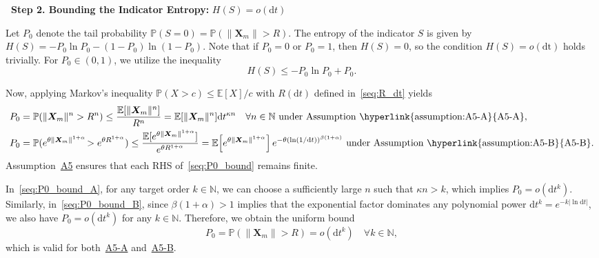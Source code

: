 \bigskip
\noindent\textbf{\textbullet\ Step 2. Bounding the Indicator Entropy:} $H(S)=o(\mathrm dt)$

Let $P_0$ denote the tail probability $\mathbb{P}(S=0) = \mathbb{P}(\|\bm{X}_m\| > R)$. The entropy of the indicator $S$ is given by $H(S) = -P_0\ln P_0 - (1-P_0)\ln(1-P_0)$. Note that if $P_0=0$ or $P_0=1$, then $H(S)=0$, so the condition $H(S)=o(\mathrm{dt})$ holds trivially. For $P_0 \in (0,1)$, we utilize the inequality
\begin{equation}
    H(S) \leq -P_0\ln P_0 + P_0.
    \label{seq:H(S)_bound}
\end{equation}

Now, applying Markov's inequality $\mathbb P(X>c)\leq\mathbb E[X]/c$ with $R(\mathrm dt)$ defined in~\eqref{seq:R_dt} yields
\begin{subequations}\label{seq:P0_bound}
\renewcommand{\theequation}{\theparentequation-\Alph{equation}}
\begin{align}
    P_0&=\mathbb P(\|\bm X_m\|^n>R^n)
    \leq\frac{\mathbb E[\|\bm X_m\|^n]}{R^n}
    =\mathbb E[\|\bm X_m\|^n]\mathrm dt^{\kappa n}
    \quad\forall n\in\mathbb N
    \text{ under Assumption~\hyperlink{assumption:A5-A}{A5-A}},
    \label{seq:P0_bound_A}
    \\
    P_0&=\mathbb P(e^{\theta\|\bm X_m\|^{1+\alpha}}\!>e^{\theta R^{1+\alpha}})
    \leq\frac{\mathbb E[e^{\theta\|\bm X_m\|^{1+\alpha}}]}{e^{\theta R^{1+\alpha}}}
    =\mathbb E\!\left[e^{\theta\|\bm X_m\|^{1+\alpha}}\right]
    e^{-\theta(\ln(1/\mathrm dt))^{\beta(1+\alpha)}}
    \text{ under Assumption~\hyperlink{assumption:A5-B}{A5-B}}.
    \label{seq:P0_bound_B}
\end{align}
\end{subequations}
Assumption~\hyperlink{assumption:A5}{A5} ensures that each RHS of~\eqref{seq:P0_bound} remains finite.

In~\eqref{seq:P0_bound_A}, for any target order $k\in\mathbb N$, we can choose a sufficiently large $n$ such that $\kappa n > k$, which implies $P_0=o(\mathrm dt^k)$. %
Similarly, in~\eqref{seq:P0_bound_B}, since $\beta(1+\alpha)>1$ implies that the exponential factor dominates any polynomial power $\mathrm dt^k=e^{-k|\ln\mathrm dt|}$, we also have $P_0=o(\mathrm dt^k)$ for any $k\in\mathbb N$.
Therefore, we obtain the uniform bound
\begin{equation}
    P_0=\mathbb P(\|\bm X_m\|>R)=o(\mathrm dt^k)
    \quad\forall k\in\mathbb N,
    \label{seq:P0_bound_uniform}
\end{equation}
which is valid for both~\hyperlink{assumption:A5-A}{A5-A} and~\hyperlink{assumption A5-B}{A5-B}.

